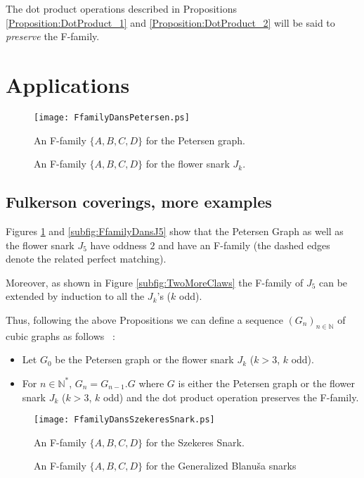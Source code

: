 \documentclass{amsart}
\theoremstyle{definition}
\theoremstyle{remark}
\begin{document}
The dot product operations described in Propositions \ref{Proposition:DotProduct_1} and \ref{Proposition:DotProduct_2} will be said to {\em preserve} the F-family.

\section{Applications}
\begin{figure}
\texttt{[image: FfamilyDansPetersen.ps]}
 \caption{An F-family $\{A,B,C,D\}$ for the Petersen graph.} \label{Fig:FfamilyDansPetersen}
\end{figure}
\begin{figure}

  \caption{An F-family $\{A,B,C,D\}$ for the flower snark $J_k$.} 
\label{Fig:FfamilyDansJk}
\end{figure}
\subsection{Fulkerson coverings, more examples}
Figures \ref{Fig:FfamilyDansPetersen} and \ref{subfig:FfamilyDansJ5} show
that the Petersen Graph as well as the flower snark $J_5$ have oddness $2$ and
have an F-family (the dashed edges denote the related perfect matching).




Moreover, as shown in Figure \ref{subfig:TwoMoreClaws} the F-family of $J_5$ can be extended by induction to all the $J_k$'s ($k$ odd).

Thus, following the above Propositions we can define a sequence $(G_n)_{n\in
\mathbb{N}}$ of cubic graphs as follows ~:
\begin{itemize}
 \item Let $G_0$ be the Petersen graph or the flower snark $J_k$ ($k>3$, $k$ odd).
 \item For $n\in \mathbb{N}^*$, $G_n=G_{n-1} . G$ where $G$ is either the
Petersen graph or the flower snark $J_k$ ($k>3$, $k$ odd) and the dot product operation preserves
the F-family.
\end{itemize}
\begin{figure}
\texttt{[image: FfamilyDansSzekeresSnark.ps]}
\caption{An F-family $\{A,B,C,D\}$ for the Szekeres Snark.} \label{Fig:FfamilyDansSzekeres}
\end{figure}
\begin{figure}
\caption{An F-family $\{A,B,C,D\}$ for the Generalized Blanu\v{s}a snarks} \label{Figure:GeneralizedBlanusa}
\end{figure}
\end{document}
